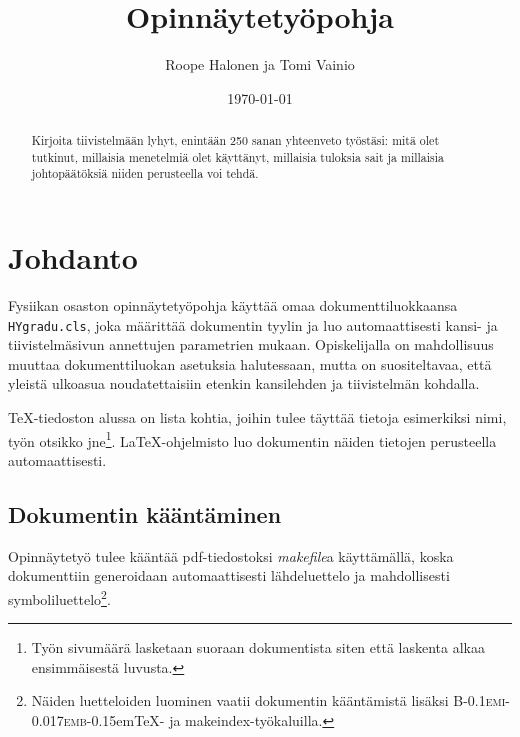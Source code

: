\documentclass[finnish,twoside,openright,utf]{HYgradu}
\title{Opinnäytetyöpohja}
\author{Roope Halonen ja Tomi Vainio}
\date{\today}
\begin{document}
\maketitle


\begin{abstract}
Kirjoita tiivistelmään lyhyt, enintään 250 sanan yhteenveto työstäsi: mitä olet tutkinut, millaisia menetelmiä olet käyttänyt, millaisia tuloksia sait ja millaisia johtopäätöksiä niiden perusteella voi tehdä.
\end{abstract}

\mytableofcontents

\mynomenclature

\chapter{Johdanto}

Fysiikan osaston opinnäytetyöpohja käyttää omaa dokumenttiluokkaansa \texttt{HYgradu.cls}, joka määrittää dokumentin tyylin ja luo automaattisesti kansi- ja tiivistelmäsivun annettujen parametrien mukaan. Opiskelijalla on mahdollisuus muuttaa dokumenttiluokan asetuksia halutessaan, mutta on suositeltavaa, että yleistä ulkoasua noudatettaisiin etenkin kansilehden ja tiivistelmän kohdalla.

\TeX-tiedoston alussa on lista kohtia, joihin tulee täyttää tietoja esimerkiksi nimi, työn otsikko jne\footnote{Työn sivumäärä lasketaan suoraan dokumentista siten että laskenta alkaa ensimmäisestä luvusta.}. \LaTeX-ohjelmisto luo dokumentin näiden tietojen perusteella automaattisesti.

\section{Dokumentin kääntäminen}
\label{sec:compile}

Opinnäytetyö tulee kääntää pdf-tiedostoksi \emph{makefile}a käyttämällä, koska dokumenttiin generoidaan automaattisesti lähdeluettelo ja mahdollisesti symboliluettelo\footnote{Näiden luetteloiden luominen vaatii dokumentin kääntämistä lisäksi \textsc{B\kern-0.1emi\kern-0.017emb}\kern-0.15em\TeX- ja makeindex-työkaluilla.}.
\end{document}
